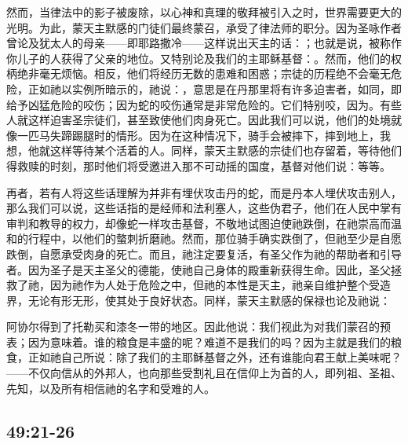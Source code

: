然而，当律法中的影子被废除，以心神和真理的敬拜被引入之时，世界需要更大的光明。为此，蒙天主默感的门徒们最终蒙召，承受了律法师的职分。因为圣咏作者曾论及犹太人的母亲——即耶路撒冷——这样说出天主的话：；也就是说，被称作你儿子的人获得了父亲的地位。又特别论及我们的主耶稣基督：。然而，他们的权柄绝非毫无烦恼。相反，他们将经历无数的患难和困惑；宗徒的历程绝不会毫无危险，正如祂以实例所暗示的，祂说：，意思是在丹那里将有许多迫害者，如同，即给予凶猛危险的咬伤；因为蛇的咬伤通常是非常危险的。它们特别咬，因为。有些人就这样迫害圣宗徒们，甚至致使他们肉身死亡。因此我们可以说，他们的处境就像一匹马失蹄踢腿时的情形。因为在这种情况下，骑手会被摔下，摔到地上，我想，他就这样等待某个活着的人。同样，蒙天主默感的宗徒们也存留着，等待他们得救赎的时刻，那时他们将受邀进入那不可动摇的国度，基督对他们说：等等。\par

再者，若有人将这些话理解为并非有埋伏攻击丹的蛇，而是丹本人埋伏攻击别人，那么我们可以说，这些话指的是经师和法利塞人，这些伪君子，他们在人民中掌有审判和教导的权力，却像蛇一样攻击基督，不敬地试图迫使祂跌倒，在祂崇高而温和的行程中，以他们的螫刺折磨祂。然而，那位骑手确实跌倒了，但祂至少是自愿跌倒，自愿承受肉身的死亡。而且，祂注定要复活，有圣父作为祂的帮助者和引导者。因为圣子是天主圣父的德能，使祂自己身体的殿重新获得生命。因此，圣父拯救了祂，因为祂作为人处于危险之中，但祂的本性是天主，祂亲自维护整个受造界，无论有形无形，使其处于良好状态。同样，蒙天主默感的保禄也论及祂说：\par

阿协尔得到了托勒买和漆冬一带的地区。因此他说：我们视此为对我们蒙召的预表；因为意味着。谁的粮食是丰盛的呢？难道不是我们的吗？因为主就是我们的粮食，正如祂自己所说：除了我们的主耶稣基督之外，还有谁能向君王献上美味呢？——不仅向信从的外邦人，也向那些受割礼且在信仰上为首的人，即列祖、圣祖、先知，以及所有相信祂的名字和受难的人。\par


\subsection{ 49:21-26}

